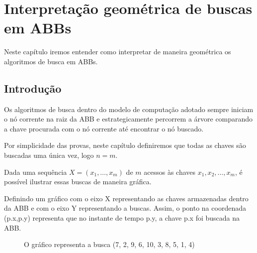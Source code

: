 
\chapter{Interpretação geométrica de buscas em ABBs}
\label{cap:geometria}

Neste capítulo iremos entender como interpretar de maneira geométrica os algoritmos de busca em ABBs.

\section{Introdução}

Os algoritmos de busca dentro do modelo de computação adotado sempre iniciam o nó corrente na raiz da ABB e estrategicamente percorrem a árvore comparando a chave procurada com o nó corrente até encontrar o nó buscado.

Por simplicidade das provas, neste capítulo definiremos que todas as chaves são buscadas uma única vez, logo $n = m$.

Dada uma sequência $X = (x_{1},\ldots,x_{m})$ de $m$ acessos às chaves $x_{1}, x_{2},\ldots,x_{m}$, é possível ilustrar essas buscas de maneira gráfica.

Definindo um gráfico com o eixo X representando as chaves armazenadas dentro da ABB e com o eixo Y representando a buscas. Assim, o ponto na coordenada (p.x,p.y) representa que no instante de tempo p.y, a chave p.x foi buscada na ABB.

\begin{figure}
    \centering    
    \caption{O gráfico representa a busca (7, 2, 9, 6, 10, 3, 8, 5, 1, 4)}
    \label{grafico2D-exemplo-inicial}
\end{figure}


